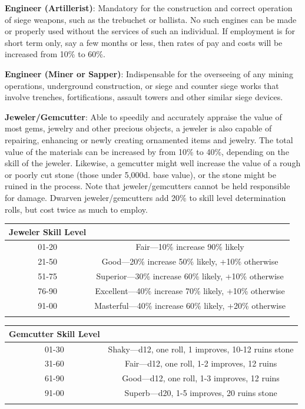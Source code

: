 \documentclass{book}
\begin{document}
\textbf{Engineer (Artillerist)}: Mandatory for the construction and
correct operation of siege weapons, such as the trebuchet or ballista.
No such engines can be made or properly used without the services of
such an individual. If employment is for short term only, say a few
months or less, then rates of pay and costs will be increased from 10\%
to 60\%.

\textbf{Engineer (Miner or Sapper)}: Indispensable for the overseeing of
any mining operations, underground construction, or siege and counter
siege works that involve trenches, fortifications, assault towers and
other similar siege devices.

\textbf{Jeweler/Gemcutter}: Able to speedily and accurately appraise the
value of most gems, jewelry and other precious objects, a jeweler is
also capable of repairing, enhancing or newly creating ornamented items
and jewelry. The total value of the materials can be increased by from
10\% to 40\%, depending on the skill of the jeweler. Likewise, a
gemcutter might well increase the value of a rough or poorly cut stone
(those under 5,000d. base value), or the stone might be ruined in the
process. Note that jeweler/gemcutters cannot be held responsible for
damage. Dwarven jeweler/gemcutters add 20\% to skill level determination
rolls, but cost twice as much to employ.

\begin{table}[ht]
	\centering
	\begin{tabular}{cc}
		\toprule
			Jeweler Skill Level & \\
		\midrule\noalign{}
			01-20 & Fair---10\% increase 90\% likely \\
			21-50 & Good---20\% increase 50\% likely, +10\% otherwise \\
			51-75 & Superior---30\% increase 60\% likely, +10\% otherwise \\
			76-90 & Excellent---40\% increase 70\% likely, +10\% otherwise \\
			91-00 & Masterful---40\% increase 60\% likely, +20\% otherwise \\
		\bottomrule\noalign{}
	\end{tabular}
\end{table}

\begin{table}[ht]
	\centering
	\begin{tabular}{cc}
		\toprule
			Gemcutter Skill Level & \\
		\midrule
			01-30 & Shaky---d12, one roll, 1 improves, 10-12 ruins stone \\
			31-60 & Fair---d12, one roll, 1-2 improves, 12 ruins \\
			61-90 & Good---d12, one roll, 1-3 improves, 12 ruins \\
			91-00 & Superb---d20, 1-5 improves, 20 ruins stone \\
		\bottomrule\noalign{}
\end{tabular}
\end{table}
\end{document}
